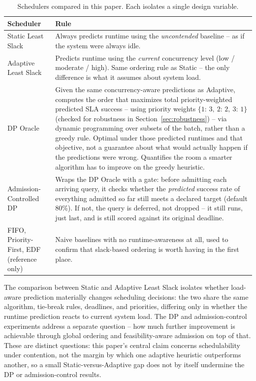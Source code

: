 \documentclass[conference]{IEEEtran}
\begin{document}
\begin{table}[t]
\caption{Schedulers compared in this paper. Each isolates a single design variable.}
\label{tab:schedulers}
\centering
\begin{tabular}{@{}p{}p{}@{}}
\toprule
\textbf{Scheduler} & \textbf{Rule} \\
\midrule
Static Least Slack & Always predicts runtime using the \emph{uncontended} baseline -- as if the system were always idle. \\[2pt]
Adaptive Least Slack & Predicts runtime using the \emph{current} concurrency level (low / moderate / high). Same ordering rule as Static -- the only difference is what it assumes about system load. \\[2pt]
DP Oracle & Given the same concurrency-aware predictions as Adaptive, computes the order that maximizes total priority-weighted predicted SLA success -- using priority weights $\{1{:}\,3,\ 2{:}\,2,\ 3{:}\,1\}$ (checked for robustness in Section~\ref{sec:robustness}) -- via dynamic programming over subsets of the batch, rather than a greedy rule. Optimal under those predicted runtimes and that objective, not a guarantee about what would actually happen if the predictions were wrong. Quantifies the room a smarter algorithm has to improve on the greedy heuristic. \\[2pt]
Admission-Controlled DP & Wraps the DP Oracle with a gate: before admitting each arriving query, it checks whether the \emph{predicted} success rate of everything admitted so far still meets a declared target (default 80\%). If not, the query is deferred, not dropped -- it still runs, just last, and is still scored against its original deadline. \\[2pt]
FIFO, Priority-First, EDF (reference only) & Naive baselines with no runtime-awareness at all, used to confirm that slack-based ordering is worth having in the first place. \\
\bottomrule
\end{tabular}
\end{table}

The comparison between Static and Adaptive Least Slack isolates whether load-aware prediction materially changes scheduling decisions: the two share the same algorithm, tie-break rules, deadlines, and priorities, differing only in whether the runtime prediction reacts to current system load. The DP and admission-control experiments address a separate question -- how much further improvement is achievable through global ordering and feasibility-aware admission on top of that. These are distinct questions: this paper's central claim concerns schedulability under contention, not the margin by which one adaptive heuristic outperforms another, so a small Static-versus-Adaptive gap does not by itself undermine the DP or admission-control results.
\end{document}
